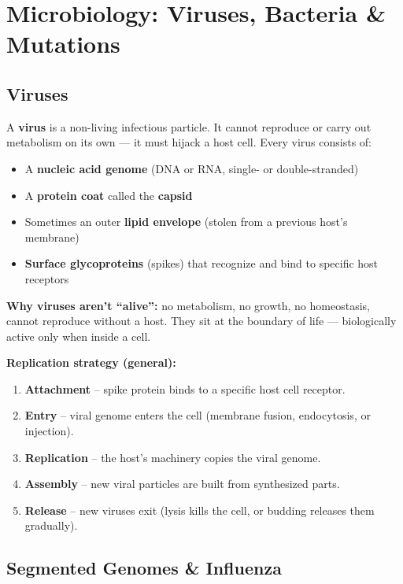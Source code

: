 \documentclass[11pt, letterpaper]{article}
\begin{document}
\section*{Microbiology: Viruses, Bacteria \& Mutations}

\subsection*{Viruses}

A \textbf{virus} is a non-living infectious particle. It cannot reproduce or carry out
metabolism on its own --- it must hijack a host cell. Every virus consists of:
\begin{itemize}[noitemsep]
  \item A \textbf{nucleic acid genome} (DNA or RNA, single- or double-stranded)
  \item A \textbf{protein coat} called the \textbf{capsid}
  \item Sometimes an outer \textbf{lipid envelope} (stolen from a previous host's membrane)
  \item \textbf{Surface glycoproteins} (spikes) that recognize and bind to specific host receptors
\end{itemize}

\textbf{Why viruses aren't ``alive'':} no metabolism, no growth, no homeostasis, cannot
reproduce without a host. They sit at the boundary of life --- biologically active only
when inside a cell.

\textbf{Replication strategy (general):}
\begin{enumerate}[noitemsep]
  \item \textbf{Attachment} -- spike protein binds to a specific host cell receptor.
  \item \textbf{Entry} -- viral genome enters the cell (membrane fusion, endocytosis, or injection).
  \item \textbf{Replication} -- the host's machinery copies the viral genome.
  \item \textbf{Assembly} -- new viral particles are built from synthesized parts.
  \item \textbf{Release} -- new viruses exit (lysis kills the cell, or budding releases them gradually).
\end{enumerate}

\subsection*{Segmented Genomes \& Influenza}
\end{document}
